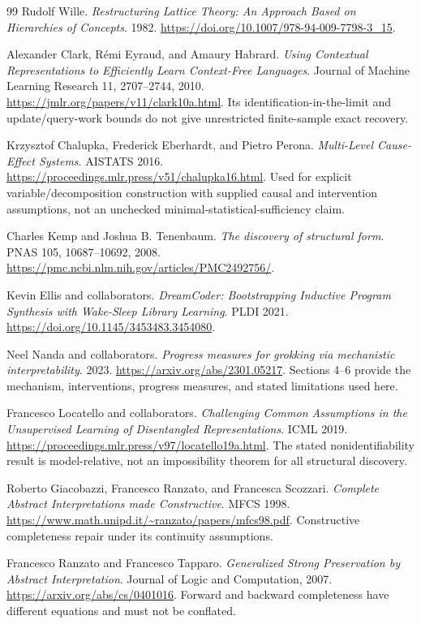 \documentclass[11pt]{article}
\theoremstyle{remark}
\begin{document}
\begin{thebibliography}{99}
Rudolf Wille. \emph{Restructuring Lattice Theory: An Approach Based on Hierarchies of Concepts}. 1982.
\url{https://doi.org/10.1007/978-94-009-7798-3_15}.

Alexander Clark, R\'emi Eyraud, and Amaury Habrard.
\emph{Using Contextual Representations to Efficiently Learn Context-Free Languages}.
Journal of Machine Learning Research 11, 2707--2744, 2010.
\url{https://jmlr.org/papers/v11/clark10a.html}.
Its identification-in-the-limit and update/query-work bounds do not give unrestricted finite-sample exact recovery.

Krzysztof Chalupka, Frederick Eberhardt, and Pietro Perona.
\emph{Multi-Level Cause-Effect Systems}. AISTATS 2016.
\url{https://proceedings.mlr.press/v51/chalupka16.html}.
Used for explicit variable/decomposition construction with supplied causal and intervention assumptions, not an unchecked minimal-statistical-sufficiency claim.

Charles Kemp and Joshua B. Tenenbaum.
\emph{The discovery of structural form}. PNAS 105, 10687--10692, 2008.
\url{https://pmc.ncbi.nlm.nih.gov/articles/PMC2492756/}.

Kevin Ellis and collaborators.
\emph{DreamCoder: Bootstrapping Inductive Program Synthesis with Wake-Sleep Library Learning}. PLDI 2021.
\url{https://doi.org/10.1145/3453483.3454080}.

Neel Nanda and collaborators. \emph{Progress measures for grokking via mechanistic interpretability}. 2023.
\url{https://arxiv.org/abs/2301.05217}.
Sections 4--6 provide the mechanism, interventions, progress measures, and stated limitations used here.

Francesco Locatello and collaborators.
\emph{Challenging Common Assumptions in the Unsupervised Learning of Disentangled Representations}. ICML 2019.
\url{https://proceedings.mlr.press/v97/locatello19a.html}.
The stated nonidentifiability result is model-relative, not an impossibility theorem for all structural discovery.

Roberto Giacobazzi, Francesco Ranzato, and Francesca Scozzari.
\emph{Complete Abstract Interpretations made Constructive}. MFCS 1998.
\url{https://www.math.unipd.it/~ranzato/papers/mfcs98.pdf}.
Constructive completeness repair under its continuity assumptions.

Francesco Ranzato and Francesco Tapparo.
\emph{Generalized Strong Preservation by Abstract Interpretation}.
Journal of Logic and Computation, 2007.
\url{https://arxiv.org/abs/cs/0401016}.
Forward and backward completeness have different equations and must not be conflated.


\end{thebibliography}
\end{document}
